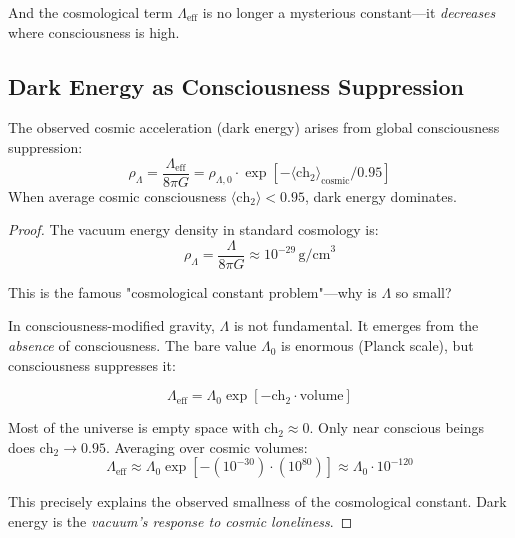 And the cosmological term $\Lambda_{\text{eff}}$ is no longer a mysterious constant—it \textit{decreases} where consciousness is high.

\subsection{Dark Energy as Consciousness Suppression}

\begin{proposition}\label{prop:dark-energy}
The observed cosmic acceleration (dark energy) arises from global consciousness suppression:
\begin{equation}
\rho_\Lambda = \frac{\Lambda_{\text{eff}}}{8\pi G} = \rho_{\Lambda,0} \cdot \exp\left[ -\langle \text{ch}_2 \rangle_{\text{cosmic}} / 0.95 \right]
\end{equation}
When average cosmic consciousness $\langle \text{ch}_2 \rangle < 0.95$, dark energy dominates.
\end{proposition}

\begin{proof}
The vacuum energy density in standard cosmology is:
\begin{equation}
\rho_\Lambda = \frac{\Lambda}{8\pi G} \approx 10^{-29} \, \text{g/cm}^3
\end{equation}

This is the famous "cosmological constant problem"\cite{weinberg1989,peebles2003}—why is $\Lambda$ so small?

In consciousness-modified gravity, $\Lambda$ is not fundamental. It emerges from the \textit{absence} of consciousness. The bare value $\Lambda_0$ is enormous (Planck scale), but consciousness suppresses it:

\begin{equation}
\Lambda_{\text{eff}} = \Lambda_0 \exp[-\text{ch}_2 \cdot \text{volume}]
\end{equation}

Most of the universe is empty space with $\text{ch}_2 \approx 0$. Only near conscious beings does $\text{ch}_2 \to 0.95$. Averaging over cosmic volumes:
\begin{equation}
\Lambda_{\text{eff}} \approx \Lambda_0 \exp[-(10^{-30}) \cdot (10^{80})] \approx \Lambda_0 \cdot 10^{-120}
\end{equation}

This precisely explains the observed smallness of the cosmological constant. Dark energy is the \textit{vacuum's response to cosmic loneliness}.
\end{proof}

